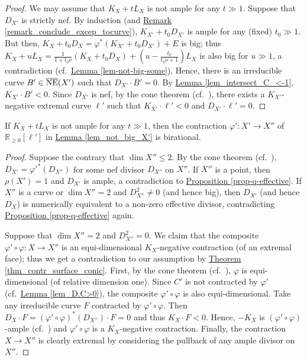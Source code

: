 \begin{proof}
We may assume that $K_X+tL_X$ is not ample for any $t\gg 1$. 
Suppose that $D_{X'}$ is  strictly nef.
By induction (and {\hyperref[remark_conclude_excep_tocurve]{Remark    \ref*{remark_conclude_excep_tocurve}}}), $K_{X'}+t_0D_{X'}$ is ample for any (fixed) $t_0\gg 1$.
But then, $K_X+t_0D_X=\varphi^*(K_{X'}+t_0D_{X'})+E$ is big; thus $K_X+uL_X=\frac{1}{1+t_0\nu}(K_X+t_0D_X)+(u-\frac{t_0}{t_0\nu+1})L_X$ is also big for  $u\gg 1$, a contradiction (cf.~{\hyperref[lem-not-big-some]{Lemma  \ref*{lem-not-big-some}}}). 
Hence, there is an irreducible curve $B'\in\overline{\textup{NE}}(X')$ such that $D_{X'}\cdot B'=0$.
By 
{\hyperref[lem_intersect_C_<-1]{Lemma \ref*{lem_intersect_C_<-1}}},
$K_{X'}\cdot B'<0$.
Since $D_{X'}$ is nef, by the cone theorem (cf.~\cite[Theorem 3.7]{KM98}), there exists a $K_{X'}$-negative extremal curve $\ell'$ such that $K_{X'}\cdot\ell'<0$ and $D_{X'}\cdot\ell'=0$. %
\end{proof}
	

\begin{lemme}\label{lem-sec-con-surface}
If $K_X+tL_X$ is not ample for any $t\gg 1$, then the contraction $\varphi':X'\to X''$ of $\mathbb{R}_{\geqslant  0}[\ell']$ in {\hyperref[lem_not_big_X']{Lemma \ref*{lem_not_big_X'}}} is birational.	
\end{lemme}

\begin{proof}
Suppose the contrary that $\dim X''\leqslant 2$.
By the cone theorem (cf.~\cite[Theorem 3.7]{KM98}), $D_{X'}=\varphi'^*(D_{X''})$ for some nef divisor $D_{X''}$ on $X''$.
If $X''$ is a point, then $\rho(X')=1$ and $D_{X'}$ is ample, a contradiction to {\hyperref[prop-q-effective]{Proposition  \ref*{prop-q-effective}}}.
If $X''$ is a curve or  $\dim X''=2$ and $D_{X''}^2\neq 0$ (and hence big),
then $D_{X'}$ (and hence $D_X$) is numerically equivalent to a non-zero effective divisor, contradicting  {\hyperref[prop-q-effective]{Proposition  \ref*{prop-q-effective}}} again. 


Suppose that $\dim X''=2$ and $D_{X''}^2=0$. 
We claim that the composite $\varphi'\circ\varphi:X\to X''$ is an equi-dimensional $K_X$-negative contraction (of an extremal face); thus we get a contradiction to our assumption by {\hyperref[thm_contr_surface_conic]{Theorem    \ref*{thm_contr_surface_conic}}}. 
First, by the cone theorem (cf.~\cite[Theorem 3.7]{KM98}), $\varphi$ is equi-dimensional (of relative dimension one).
Since $C'$ is not contracted by $\varphi'$ (cf.~{\hyperref[lem_D.C>0]{Lemma \ref*{lem_D.C>0}}}), the composite $\varphi'\circ\varphi$ is also equi-dimensional. 
Take any irreducible curve $F$ contracted by $\varphi'\circ\varphi$.
Then $D_X\cdot F=(\varphi'\circ\varphi)^*(D_{X''})\cdot F=0$ and thus $K_X\cdot F<0$.
Hence, $-K_X$ is $(\varphi'\circ\varphi)$-ample  (cf.~\cite[Theorem 1.42]{KM98}) and 
$\varphi'\circ\varphi$ is a $K_X$-negative contraction.
Finally, the contraction $X\to X''$ is  clearly extremal by 
considering the pullback of any ample divisor on $X''$. %
\end{proof}


